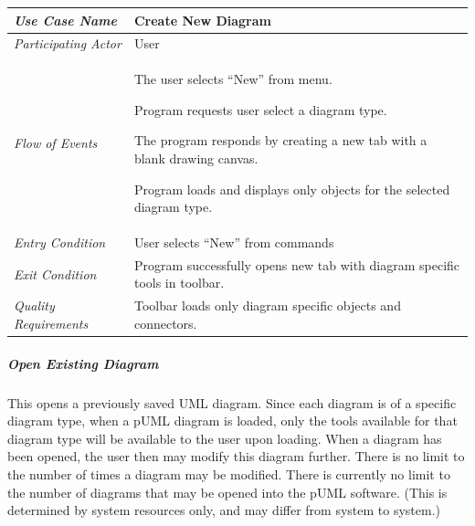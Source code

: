 \documentclass[twoside,letterpaper]{article}
\newenvironment{my_enumerate}{
\begin{enumerate}
  \setlength{\itemsep}{1pt}
  \setlength{\parskip}{0pt}
  \setlength{\parsep}{0pt}}{\end{enumerate}
}
\begin{document}
\begin{flushleft}
\tablehead{}
\begin{tabular}{|m{2.0in} m{5.0in}|}
\hline
{\bfseries\emph{Use Case Name}}
& {\bfseries Create New Diagram }
\\\hline
\emph{Participating Actor}
& User
\\\hline
\emph{Flow of Events}
& \begin{my_enumerate}
\item The user selects ``New'' from menu.
\item Program requests user select a diagram type.
\item The program responds by creating a new tab with a blank drawing canvas.
\item Program loads and displays only objects for the selected diagram type.
\end{my_enumerate}
\\\hline
\emph{Entry Condition}
& User selects ``New'' from commands
\\\hline
\emph{Exit Condition}
& Program successfully opens new tab with diagram specific tools in toolbar.
\\\hline
\emph{Quality Requirements}
& Toolbar loads only diagram specific objects and connectors.
\\\hline
\end{tabular}
\end{flushleft}

\bigskip



\subparagraph[\ Open Existing Diagram ] 
{\bfseries Open Existing Diagram }
{ This opens a previously saved UML diagram. Since each diagram is of a specific diagram type, when a pUML diagram is loaded, only the tools available for that diagram type will be available to the user upon loading. When a diagram has been opened, the user then may modify this diagram further. There is no limit to the number of times a diagram may be modified.  There is currently no limit to the number of diagrams that may be opened into the pUML software. (This is determined by system resources only, and may differ from system to system.)  }
\end{document}
